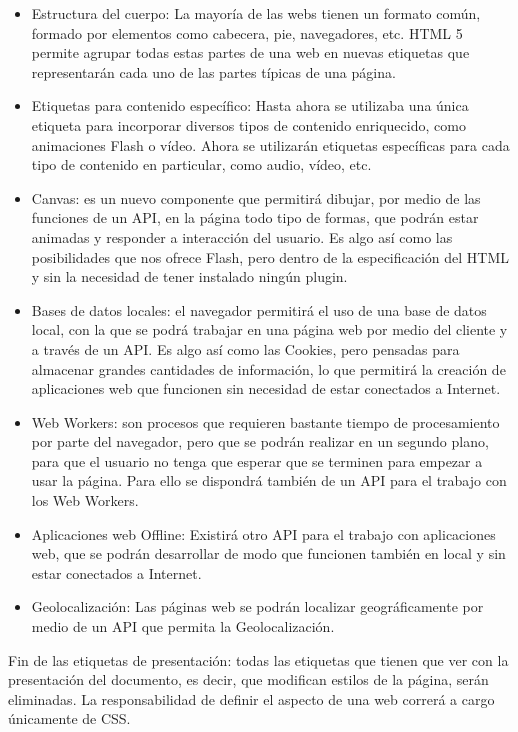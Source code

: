 \documentclass[12pt]{book}
\begin{document}
\begin{itemize}
	\item Estructura del cuerpo: La mayoría de las webs tienen un formato común, formado por elementos como cabecera, pie, navegadores, etc. HTML 5 permite agrupar todas estas partes de una web en nuevas etiquetas que representarán cada uno de las partes típicas de una página.
	\item Etiquetas para contenido específico: Hasta ahora se utilizaba una única etiqueta para incorporar diversos tipos de contenido enriquecido, como animaciones Flash o vídeo. Ahora se utilizarán etiquetas específicas para cada tipo de contenido en particular, como audio, vídeo, etc.
	\item Canvas: es un nuevo componente que permitirá dibujar, por medio de las funciones de un API, en la página todo tipo de formas, que podrán estar animadas y responder a interacción del usuario. Es algo así como las posibilidades que nos ofrece Flash, pero dentro de la especificación del HTML y sin la necesidad de tener instalado ningún plugin.
	\item Bases de datos locales: el navegador permitirá el uso de una base de datos local, con la que se podrá trabajar en una página web por medio del cliente y a través de un API. Es algo así como las Cookies, pero pensadas para almacenar grandes cantidades de información, lo que permitirá la creación de aplicaciones web que funcionen sin necesidad de estar conectados a Internet.
	\item Web Workers: son procesos que requieren bastante tiempo de procesamiento por parte del navegador, pero que se podrán realizar en un segundo plano, para que el usuario no tenga que esperar que se terminen para empezar a usar la página. Para ello se dispondrá también de un API para el trabajo con los Web Workers.
	\item Aplicaciones web Offline: Existirá otro API para el trabajo con aplicaciones web, que se podrán desarrollar de modo que funcionen también en local y sin estar conectados a Internet.
	\item Geolocalización: Las páginas web se podrán localizar geográficamente por medio de un API que permita la Geolocalización.
\end{itemize}
Fin de las etiquetas de presentación: todas las etiquetas que tienen que ver con la presentación del documento, es decir, que modifican estilos de la página, serán eliminadas. La responsabilidad de definir el aspecto de una web correrá a cargo únicamente de CSS. \\
\end{document}
